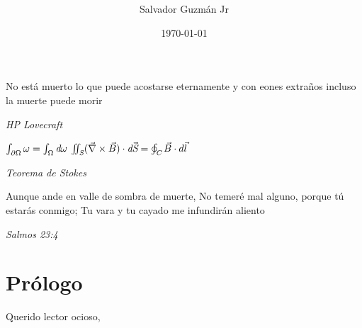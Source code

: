 \documentclass{article}
\begin{document}
	\title{
		\Large{
		}
	}
	
	\author{Salvador Guzm\'{a}n Jr}
	\date{\today}
	\maketitle
	
	\pagebreak
	\begin{center}
		\thispagestyle{empty}
		\vspace*{\fill}
					\textbf{
		}
		
		\vspace*{\fill}
	\end{center}
	\pagebreak
	\begin{center}
		\epigraph{
			No est\'{a} muerto lo que puede acostarse eternamente
			y con eones extraños  incluso la muerte
			puede morir
		}{\textit{
			HP Lovecraft
		}}
		\epigraph{
			\begin{math}
				\int_{\partial\Omega} \omega=\int_{\Omega} \emph{d}\omega
			\end{math}
			\linebreak
			\linebreak
			\begin{math}
				\iint_{\emph{S}}(\vec{\nabla}\times\vec{B})\cdot \emph{d}\vec{\emph{S}}=\oint_{\emph{C}}\vec{B}\cdot d \vec{l}
			\end{math}
		}{
			\textit{Teorema de Stokes}
		}

		\epigraph{
			Aunque ande en valle de sombra de muerte,
			No temeré mal alguno, porque tú estarás conmigo;
			Tu vara y tu cayado me infundirán aliento
		}{
			\textit{Salmos 23:4}
		}
	\end{center}
	\pagebreak
	\tableofcontents
	\pagebreak
	
	\section{Prólogo}
	Querido lector ocioso,
\end{document}
